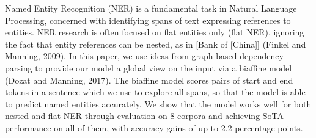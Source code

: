 Named Entity Recognition (NER) is a fundamental task in Natural Language Processing, concerned with identifying spans of text expressing references to entities. NER research is often focused on flat entities only (flat NER), ignoring the fact that entity references can be nested, as in [Bank of [China]] (Finkel and Manning, 2009). In this paper, we use ideas from graph-based dependency parsing to provide our model a global view on the input via a biaffine model (Dozat and Manning, 2017). The biaffine model scores pairs of start and end tokens in a sentence which we use to explore all spans, so that the model is able to predict named entities accurately. We show that the model works well for both nested and flat NER through evaluation on 8 corpora and achieving SoTA performance on all of them, with accuracy gains of up to 2.2 percentage points.
